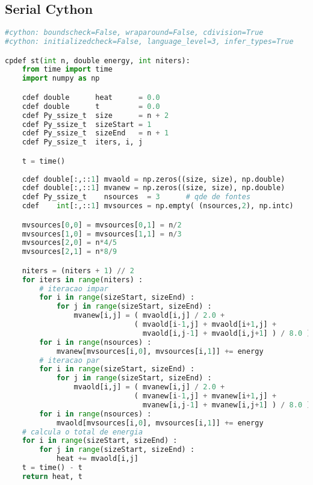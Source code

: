 \subsection{Serial Cython}
\begin{lstlisting}[language=Python, caption={Serial Cython implementation of the stencil test case - Cython module code.}]
#cython: boundscheck=False, wraparound=False, cdivision=True
#cython: initializedcheck=False, language_level=3, infer_types=True

cpdef st(int n, double energy, int niters):
    from time import time
    import numpy as np

    cdef double      heat      = 0.0
    cdef double      t         = 0.0
    cdef Py_ssize_t  size      = n + 2
    cdef Py_ssize_t  sizeStart = 1
    cdef Py_ssize_t  sizeEnd   = n + 1
    cdef Py_ssize_t  iters, i, j

    t = time()
    
    cdef double[:,::1] mvaold = np.zeros((size, size), np.double)
    cdef double[:,::1] mvanew = np.zeros((size, size), np.double)
    cdef Py_ssize_t    nsources  = 3      # qde de fontes
    cdef    int[:,::1] mvsources = np.empty( (nsources,2), np.intc)

    mvsources[0,0] = mvsources[0,1] = n/2
    mvsources[1,0] = mvsources[1,1] = n/3
    mvsources[2,0] = n*4/5
    mvsources[2,1] = n*8/9

    niters = (niters + 1) // 2
    for iters in range(niters) :
        # iteracao impar
        for i in range(sizeStart, sizeEnd) :
            for j in range(sizeStart, sizeEnd) :
                mvanew[i,j] = ( mvaold[i,j] / 2.0 +
                              ( mvaold[i-1,j] + mvaold[i+1,j] +
                                mvaold[i,j-1] + mvaold[i,j+1] ) / 8.0 )
        for i in range(nsources) :
            mvanew[mvsources[i,0], mvsources[i,1]] += energy
        # iteracao par
        for i in range(sizeStart, sizeEnd) :
            for j in range(sizeStart, sizeEnd) :
                mvaold[i,j] = ( mvanew[i,j] / 2.0 +
                              ( mvanew[i-1,j] + mvanew[i+1,j] +
                                mvanew[i,j-1] + mvanew[i,j+1] ) / 8.0 )
        for i in range(nsources) :
            mvaold[mvsources[i,0], mvsources[i,1]] += energy
    # calcula o total de energia
    for i in range(sizeStart, sizeEnd) :
        for j in range(sizeStart, sizeEnd) :
            heat += mvaold[i,j]
    t = time() - t
    return heat, t
\end{lstlisting}




